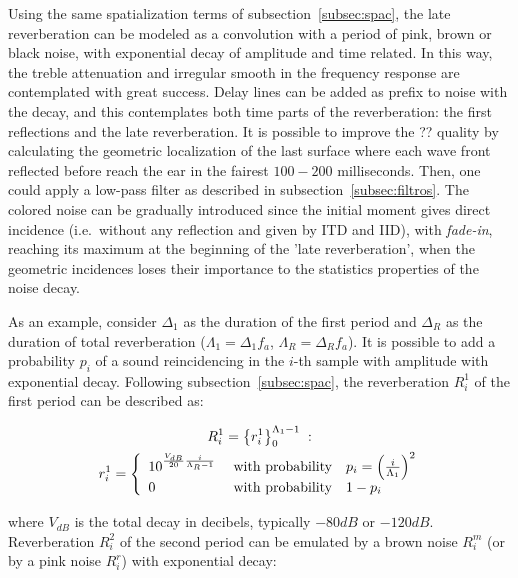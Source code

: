 \documentclass[
 aip,
 jmp,
 amsmath,amssymb,
 reprint,
]{revtex4-1}
\begin{document}
Using the same spatialization terms of subsection~\ref{subsec:spac}, the
late reverberation can be modeled as a convolution with a period of pink, brown
or black noise, with exponential decay of amplitude and time related. In
this way, the treble attenuation and irregular smooth in the frequency response
are contemplated with great success. Delay lines can be added as prefix to noise
with the decay, and this contemplates both time parts of the reverberation: the
first reflections and the late reverberation. It is possible to improve the ??
quality by calculating the geometric localization of the last surface where each
wave front reflected before reach the ear in the fairest $100-200$ milliseconds. Then, one could apply a low-pass filter as described in subsection~\ref{subsec:filtros}. The colored
noise can be gradually introduced since the initial moment gives direct
incidence (i.e.\ without any reflection and given by ITD and IID),
with \emph{fade-in}, reaching its maximum at the beginning of the 'late
reverberation', when the geometric incidences loses their importance to the
statistics properties of the noise decay.

As an example, consider $\Delta_1$ as the duration of the first period and $\Delta_R$ as the duration of total reverberation ($\Lambda_1=\Delta_1 f_a$, $\Lambda_R=\Delta_R
f_a$). It is possible to add a probability $p_i$ of a sound reincidencing in the
$i$-th sample with amplitude with exponential decay. Following
subsection~\ref{subsec:spac}, the reverberation $R_i^1$ of the first period can
be described as:

\begin{multline}\label{eq:p1rev}
    R_i^1=\left\{r_i^1\right\}_0^{\Lambda_1-1}\;: \\ \;r_i^1=\left\{
        \begin{array}{l l}
            10^{\frac{V_{dB}}{20}\frac{i}{\Lambda_R-1}}\;  & \text{with probability}\quad p_i=\left(\frac{i}{\Lambda_1}\right)^2 \\
                                     0 \; & \text{with probability}\quad 1-p_i \\
        \end{array} \right.
\end{multline}

\noindent where $V_{dB}$ is the total decay in decibels, typically $-80dB$ or
        $-120dB$. Reverberation $R_i^2$ of the second period can be emulated by a
        brown noise $R_i^m$ (or by a pink noise $R_i^r$) with exponential decay:
\end{document}
